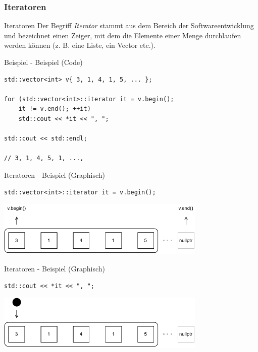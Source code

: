 \subsubsection{Iteratoren}

\begin{frame}{Iteratoren}
    Der Begriff \emph{Iterator} stammt aus dem Bereich der Softwareentwicklung und bezeichnet einen Zeiger, mit dem die Elemente einer Menge durchlaufen werden können (z. B. eine Liste, ein Vector etc.).
\end{frame}

\begin{frame}[fragile]{Beispiel - Beispiel (Code)}
    \begin{verbatim}
std::vector<int> v{ 3, 1, 4, 1, 5, ... };

for (std::vector<int>::iterator it = v.begin();
    it != v.end(); ++it)
    std::cout << *it << ", ";

std::cout << std::endl;

// 3, 1, 4, 5, 1, ...,
    \end{verbatim}
\end{frame}

\begin{frame}[fragile]{Iteratoren - Beispiel (Graphisch)}
    \begin{verbatim}
std::vector<int>::iterator it = v.begin();
    \end{verbatim}

    \begin{center}
        \includegraphics[width=0.75\textwidth]{pictures/iterators_example_1.pdf}
    \end{center}
\end{frame}

\begin{frame}[fragile]{Iteratoren - Beispiel (Graphisch)}
    \begin{verbatim}
std::cout << *it << ", ";
    \end{verbatim}

    \begin{center}
        \includegraphics[width=0.75\textwidth]{pictures/iterators_example_2.pdf}
    \end{center}
\end{frame}

